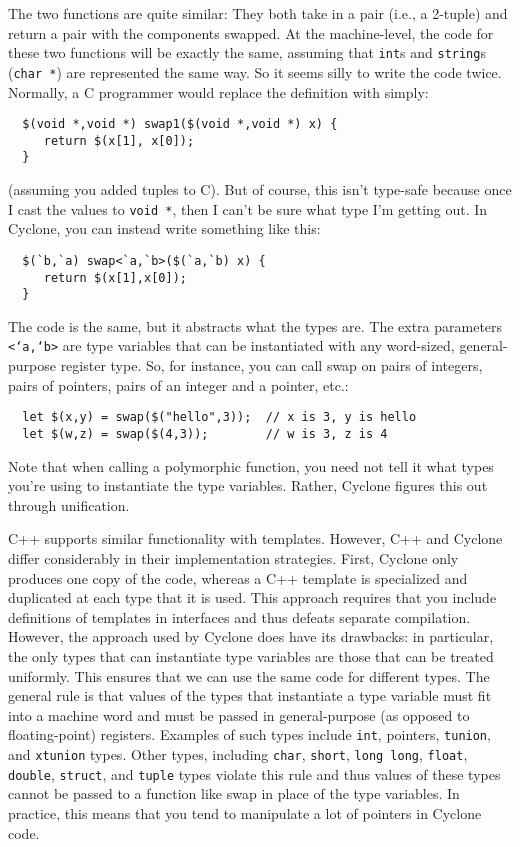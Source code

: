 The two functions are quite similar: They both take in a pair (i.e., a
2-tuple) and return a pair with the components swapped.  At the
machine-level, the code for these two functions will be exactly the
same, assuming that \texttt{int}s and \texttt{string}s (\texttt{char *}) are
represented the same way.  So it seems silly to write the code twice.
Normally, a C programmer would replace the definition with simply:
\begin{verbatim}
  $(void *,void *) swap1($(void *,void *) x) {
     return $(x[1], x[0]);
  }
\end{verbatim}
(assuming you added tuples to C).  But of course, this isn't type-safe
because once I cast the values to \texttt{void *}, then I can't be sure
what type I'm getting out.  In Cyclone, you can instead write
something like this:
\begin{verbatim}
  $(`b,`a) swap<`a,`b>($(`a,`b) x) {
     return $(x[1],x[0]);
  }
\end{verbatim}
The code is the same, but it abstracts what the types are.  The extra
parameters \texttt{<`a,`b>} are type variables that can be instantiated
with any word-sized, general-purpose register type.  So, for instance,
you can call swap on pairs of integers, pairs of pointers, pairs of an
integer and a pointer, etc.:
\begin{verbatim}
  let $(x,y) = swap($("hello",3));  // x is 3, y is hello
  let $(w,z) = swap($(4,3));        // w is 3, z is 4
\end{verbatim}

Note that when calling a polymorphic function, you need not tell it
what types you're using to instantiate the type variables.  Rather,
Cyclone figures this out through unification.

C++ supports similar functionality with templates.  However, C++ and
Cyclone differ considerably in their implementation strategies.
First, Cyclone only produces one copy of the code, whereas a C++
template is specialized and duplicated at each type that it is used.
This approach requires that you include definitions of templates in
interfaces and thus defeats separate compilation.  However, the
approach used by Cyclone does have its drawbacks: in particular, the
only types that can instantiate type variables are those that can be
treated uniformly.  This ensures that we can use the same code for
different types.  The general rule is that values of the types that
instantiate a type variable must fit into a machine word and must be
passed in general-purpose (as opposed to floating-point) registers.
Examples of such types include \texttt{int}, pointers, \texttt{tunion},
and \texttt{xtunion} types.  Other types, including \texttt{char},
\texttt{short}, \texttt{long long}, \texttt{float}, \texttt{double},
\texttt{struct}, and \texttt{tuple} types violate this rule and thus
values of these types cannot be passed to a function like swap in
place of the type variables. In practice, this means that you tend to
manipulate a lot of pointers in Cyclone code.

